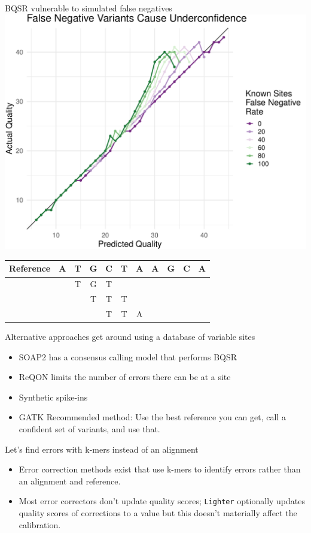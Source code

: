 \documentclass[table]{beamer}
\begin{document}

\begin{frame}{BQSR vulnerable to simulated false negatives}
\centering
\includegraphics[width=.65\linewidth]{fnr.pdf}


\begin{tabular}{r c c c x c c c c c c}
Reference & A & T & G & C & T & A & A & G & C & A\\
\hline
& &T &G &T & & & & & & \\
& & &T & T& T& & & & & \\
& & & &T & T& A& & & & \\
\end{tabular}

\end{frame}

\begin{frame}{Alternative approaches get around using a database of variable sites}
\begin{itemize}
	\item SOAP2 has a consensus calling model that performs BQSR
	\item ReQON limits the number of errors there can be at a site
	\item Synthetic spike-ins
	\item GATK Recommended method: Use the best reference you can get, call a confident set of variants, and use that.
\end{itemize}
\end{frame}

\begin{frame}{Let's find errors with k-mers instead of an alignment}

\begin{itemize}
\item Error correction methods exist that use k-mers to identify errors rather than an alignment and reference.
\item Most error correctors don't update quality scores; \texttt{Lighter} optionally updates quality scores of corrections to a value but this doesn't materially affect the calibration.
\end{itemize}

\end{frame}
\end{document}
